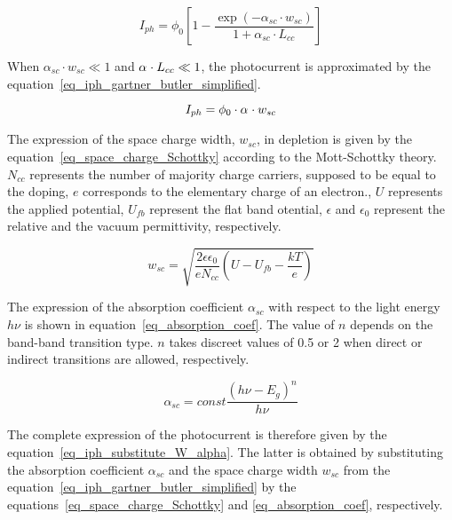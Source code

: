     \begin{equation}
        I_{ph} = \phi _0 \left[ 1 - \frac{\exp (-\alpha _{sc} \cdot w_{sc})}{1+\alpha _{sc} \cdot
        L_{cc}} \right]
        \label{eq_iph_gartner_butler}
    \end{equation}

    When $\alpha _{sc} \cdot w_{sc} \ll 1$ and $\alpha _{\sc} \cdot L_{cc} \ll 1$, 
    the photocurrent is approximated by the 
    equation~\ref{eq_iph_gartner_butler_simplified}.

    \begin{equation}
        I_{ph} = \phi _0 \cdot \alpha _{\sc} \cdot w_{sc}
        \label{eq_iph_gartner_butler_simplified}
    \end{equation}

    The expression of the space charge width, $w_{sc}$, in depletion is given 
    by the equation~\ref{eq_space_charge_Schottky} according to the Mott-Schottky theory. 
    $N_{cc}$ represents the number of majority charge carriers, supposed to be 
    equal to the doping, $e$ corresponds to the elementary charge of an electron., 
    $U$ represents the applied potential, $U_{fb}$ represent the flat band 
    otential, $\epsilon$ and $\epsilon _0$ represent the relative and the 
    vacuum permittivity, respectively.   

    \begin{equation}
        w_{sc} = \sqrt{ \frac{2\epsilon \epsilon _0}{e N_{cc}} (U-U_{fb}-\frac{kT}{e}) }
        \label{eq_space_charge_Schottky}
    \end{equation}

    The expression of the absorption coefficient $\alpha _{sc}$ with respect to 
    the light energy $h\nu$ is shown in equation~\ref{eq_absorption_coef}. 
    The value of $n$ depends on the band-band transition type. $n$ takes discreet 
    values of 0.5 or 2 when direct or indirect transitions are allowed, respectively.
      

    \begin{equation}
        \alpha _{sc} = const \frac{(h\nu - E_g)^n}{h\nu}
        \label{eq_absorption_coef}
    \end{equation}

    The complete expression of the photocurrent is therefore given by the 
    equation~\ref{eq_iph_substitute_W_alpha}. 
    The latter is obtained by substituting the absorption coefficient $\alpha _{sc}$ 
    and the space charge width $w_{sc}$ from the 
    equation~\ref{eq_iph_gartner_butler_simplified}
    by the equations~\ref{eq_space_charge_Schottky} and \ref{eq_absorption_coef}, 
    respectively. 

